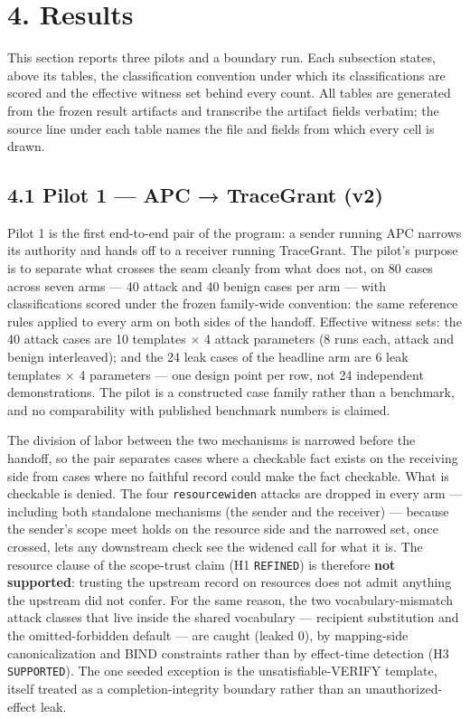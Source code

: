 \documentclass[
  10pt,
]{article}
\renewcommand{\_}{\origunderscore\allowbreak}
\begin{document}
\section{4. Results}\label{results}

This section reports three pilots and a boundary run. Each subsection
states, above its tables, the classification convention under which its
classifications are scored and the effective witness set behind every
count. All tables are generated from the frozen result artifacts and
transcribe the artifact fields verbatim; the source line under each
table names the file and fields from which every cell is drawn.

\subsection{4.1 Pilot 1 --- APC → TraceGrant
(v2)}\label{pilot-1-apc-tracegrant-v2}

Pilot 1 is the first end-to-end pair of the program: a sender running
APC narrows its authority and hands off to a receiver running
TraceGrant. The pilot's purpose is to separate what crosses the seam
cleanly from what does not, on 80 cases across seven arms --- 40 attack
and 40 benign cases per arm --- with classifications scored under the
frozen family-wide convention: the same reference rules applied to every
arm on both sides of the handoff. Effective witness sets: the 40 attack
cases are 10 templates × 4 attack parameters (8 runs each, attack and
benign interleaved); and the 24 leak cases of the headline arm are 6
leak templates × 4 parameters --- one design point per row, not 24
independent demonstrations. The pilot is a constructed case family
rather than a benchmark, and no comparability with published benchmark
numbers is claimed.

The division of labor between the two mechanisms is narrowed before the
handoff, so the pair separates cases where a checkable fact exists on
the receiving side from cases where no faithful record could make the
fact checkable. What is checkable is denied. The four
\texttt{resource\_widen} attacks are dropped in every arm --- including
both standalone mechanisms (the sender and the receiver) --- because the
sender's scope meet holds on the resource side and the narrowed set,
once crossed, lets any downstream check see the widened call for what it
is. The resource clause of the scope-trust claim (H1 \texttt{REFINED})
is therefore \textbf{not supported}: trusting the upstream record on
resources does not admit anything the upstream did not confer. For the
same reason, the two vocabulary-mismatch attack classes that live inside
the shared vocabulary --- recipient substitution and the
omitted-forbidden default --- are caught (leaked 0), by mapping-side
canonicalization and BIND constraints rather than by effect-time
detection (H3 \texttt{SUPPORTED}). The one seeded exception is the
unsatisfiable-VERIFY template, itself treated as a completion-integrity
boundary rather than an unauthorized-effect leak.
\end{document}
